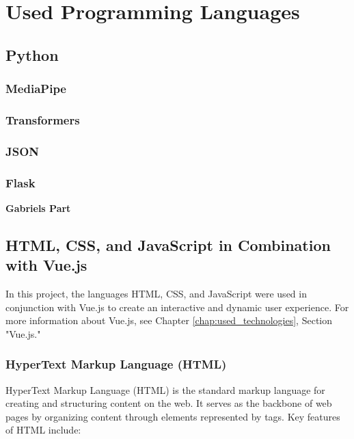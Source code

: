 
\chapter{Used Programming Languages}
\label{chap:used_programming_languages}


\section{Python}

\subsection{MediaPipe}

\subsection{Transformers}

\subsection{JSON}

\subsection{Flask}



\textbf{Gabriels Part}

\section{HTML, CSS, and JavaScript in Combination with Vue.js}

In this project, the languages HTML, CSS, and JavaScript were used in conjunction with Vue.js to create an interactive and dynamic user experience. For more information about Vue.js, see Chapter \ref{chap:used_technologies}, Section "Vue.js."

\subsection{HyperText Markup Language (HTML)}

HyperText Markup Language (HTML) is the standard markup language for creating and structuring content on the web. It serves as the backbone of web pages by organizing content through elements represented by tags. Key features of HTML include:

